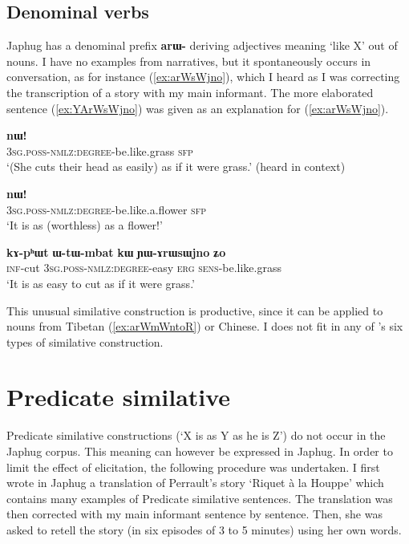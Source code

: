 \documentclass[oneside,a4paper,11pt]{article}
\newcommand{\ipa}[1]{{\phon\textbf{#1}}} %
\begin{document}
\subsection{Denominal verbs}
Japhug has a denominal prefix \ipa{arɯ-} deriving adjectives meaning `like X' out of nouns. I have no examples from narratives, but it spontaneously occurs in conversation, as for instance (\ref{ex:arWsWjno}), which I heard as I was correcting the transcription of a story with my main informant. The more elaborated sentence (\ref{ex:YArWsWjno}) was given as an explanation for (\ref{ex:arWsWjno}).

\begin{exe}
\ex \label{ex:arWsWjno}
\gll \ipa{ɯ-tɯ-ɤrɯsɯjno} 	\ipa{nɯ!}  \\
\textsc{3sg.poss-nmlz:degree}-be.like.grass \textsc{sfp} \\
\glt `(She cuts their head as easily) as if it were grass.' (heard in context)
\end{exe}

\begin{exe}
\ex \label{ex:arWmWntoR}
\gll \ipa{ɯ-tɯ-ɤrɯmɯntoʁ} 	\ipa{nɯ!}  \\
\textsc{3sg.poss-nmlz:degree}-be.like.a.flower \textsc{sfp} \\
\glt `It is as (worthless) as a flower!'
\end{exe}


\begin{exe}
\ex \label{ex:YArWsWjno}
\gll  
\ipa{kɤ-pʰɯt} 	\ipa{ɯ-tɯ-mbat} 	\ipa{kɯ} 	\ipa{ɲɯ-ɤrɯsɯjno} 	\ipa{ʑo} \\
\textsc{inf}-cut  \textsc{3sg.poss-nmlz:degree}-easy \textsc{erg} \textsc{sens}-be.like.grass \\
\glt `It is as easy to cut as if it were grass.' 
\end{exe}

This unusual similative construction is productive, since it can be applied to nouns from Tibetan (\ref{ex:arWmWntoR}) or Chinese. I does not fit in any of \citet{haspelmath17equative}'s six types of similative construction.


\section{Predicate similative} \label{sec:pred.similative}
Predicate similative constructions (`X is as Y as he is Z') do not occur in the Japhug corpus. This meaning can however be expressed in Japhug. In order to limit the effect of elicitation, the following procedure was undertaken. I first wrote in Japhug a translation of Perrault's story `Riquet à la Houppe' which contains many examples of Predicate similative sentences. The translation was then corrected with my main informant sentence by sentence. Then, she was asked to retell the story (in six episodes of 3 to 5 minutes) using her own words.
\end{document}
